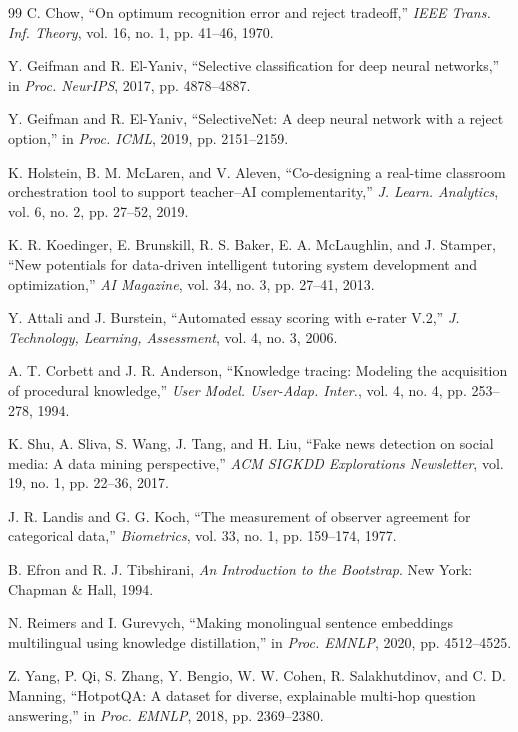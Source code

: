 \documentclass[journal]{IEEEtran}
\begin{document}
\begin{thebibliography}{99}
C. Chow, ``On optimum recognition error and reject tradeoff,'' \textit{IEEE Trans. Inf. Theory}, vol. 16, no. 1, pp. 41--46, 1970.

Y. Geifman and R. El-Yaniv, ``Selective classification for deep neural networks,'' in \textit{Proc. NeurIPS}, 2017, pp. 4878--4887.

Y. Geifman and R. El-Yaniv, ``SelectiveNet: A deep neural network with a reject option,'' in \textit{Proc. ICML}, 2019, pp. 2151--2159.

K. Holstein, B. M. McLaren, and V. Aleven, ``Co-designing a real-time classroom orchestration tool to support teacher--AI complementarity,'' \textit{J. Learn. Analytics}, vol. 6, no. 2, pp. 27--52, 2019.

K. R. Koedinger, E. Brunskill, R. S. Baker, E. A. McLaughlin, and J. Stamper, ``New potentials for data-driven intelligent tutoring system development and optimization,'' \textit{AI Magazine}, vol. 34, no. 3, pp. 27--41, 2013.

Y. Attali and J. Burstein, ``Automated essay scoring with e-rater V.2,'' \textit{J. Technology, Learning, Assessment}, vol. 4, no. 3, 2006.

A. T. Corbett and J. R. Anderson, ``Knowledge tracing: Modeling the acquisition of procedural knowledge,'' \textit{User Model. User-Adap. Inter.}, vol. 4, no. 4, pp. 253--278, 1994.

K. Shu, A. Sliva, S. Wang, J. Tang, and H. Liu, ``Fake news detection on social media: A data mining perspective,'' \textit{ACM SIGKDD Explorations Newsletter}, vol. 19, no. 1, pp. 22--36, 2017.

J. R. Landis and G. G. Koch, ``The measurement of observer agreement for categorical data,'' \textit{Biometrics}, vol. 33, no. 1, pp. 159--174, 1977.

B. Efron and R. J. Tibshirani, \textit{An Introduction to the Bootstrap}. New York: Chapman \& Hall, 1994.

N. Reimers and I. Gurevych, ``Making monolingual sentence embeddings multilingual using knowledge distillation,'' in \textit{Proc. EMNLP}, 2020, pp. 4512--4525.

Z. Yang, P. Qi, S. Zhang, Y. Bengio, W. W. Cohen, R. Salakhutdinov, and C. D. Manning, ``HotpotQA: A dataset for diverse, explainable multi-hop question answering,'' in \textit{Proc. EMNLP}, 2018, pp. 2369--2380.


\end{thebibliography}
\end{document}
